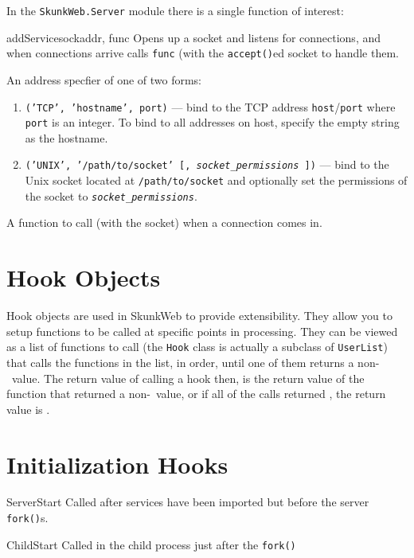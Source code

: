 \documentclass{manual}
\begin{document}
In the \texttt{SkunkWeb.Server} module there is a single function of
interest: 
\begin{funcdesc}{addService}{sockaddr, func}
Opens up a socket and listens for connections, and when connections
arrive calls \texttt{func} (with the \texttt{accept()}ed socket to
handle them. 
\begin{argdesc}
\item[sockaddr] An address specfier of one of two forms:
\begin{enumerate}
\item \texttt{('TCP', 'hostname', port)} --- bind to the TCP address
\texttt{host}/\texttt{port} where \texttt{port} is an integer.  To
bind to all addresses on host, specify the empty string as the
hostname.
\item \texttt{('UNIX', '/path/to/socket' [,
\textit{socket_permissions} ])} --- bind to the Unix socket located at
\verb!/path/to/socket! and optionally set the permissions of the
socket to \texttt{\textit{socket_permissions}}.
\end{enumerate}
\item[func] A function to call (with the socket) when a connection
comes in.
\end{argdesc}
\end{funcdesc}

\section{Hook Objects}
Hook objects are used in SkunkWeb to provide extensibility.  They
allow you to setup functions to be called at specific points in
processing.  They can be viewed as a list of functions to call 
(the \texttt{Hook} class is actually a subclass of \texttt{UserList})
that calls the functions in the list, in order, until one of them
returns a non-\None\ value.  The return value of calling a hook then,
is the return value of the function that returned a non-\None\ value,
or if all of the calls returned \None, the return value is \None.

\section{Initialization Hooks}

\begin{datadesc}{ServerStart}  Called after services have been imported but
before the server \texttt{fork()}s.
\end{datadesc}
\begin{datadesc}{ChildStart}
Called in the child process just after the \texttt{fork()}
\end{datadesc}
\end{document}
